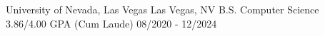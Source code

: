 \eduheader
{University of Nevada, Las Vegas}
{Las Vegas, NV}
{B.S. Computer Science \hspace{0.1em} \textbar\ \hspace{0.1em} 3.86/4.00 GPA (Cum Laude)}
{08/2020 - 12/2024}